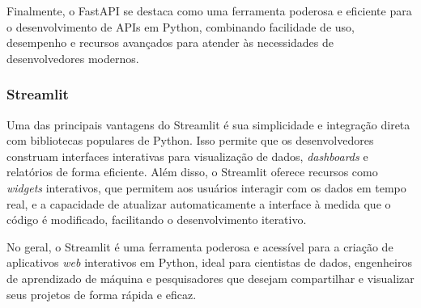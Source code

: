 \documentclass[a4paper, 12pt]{article}
\begin{document}
    Finalmente, o FastAPI se destaca como uma ferramenta poderosa e eficiente para o desenvolvimento de APIs em Python, combinando facilidade de uso, desempenho e recursos avançados para atender às necessidades de desenvolvedores modernos.

    \subsubsection{Streamlit} \label{sec:streamlit}
    

    Uma das principais vantagens do Streamlit é sua simplicidade e integração direta com bibliotecas populares de Python. Isso permite que os desenvolvedores construam interfaces interativas para visualização de dados, \textit{dashboards} e relatórios de forma eficiente. Além disso, o Streamlit oferece recursos como \textit{widgets} interativos, que permitem aos usuários interagir com os dados em tempo real, e a capacidade de atualizar automaticamente a interface à medida que o código é modificado, facilitando o desenvolvimento iterativo.

    No geral, o Streamlit é uma ferramenta poderosa e acessível para a criação de aplicativos \textit{web} interativos em Python, ideal para cientistas de dados, engenheiros de aprendizado de máquina e pesquisadores que desejam compartilhar e visualizar seus projetos de forma rápida e eficaz.

    \clearpage


\end{document}
